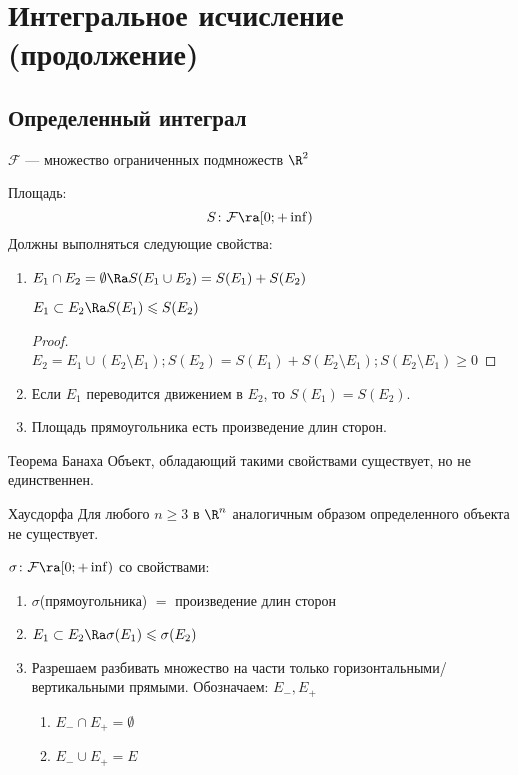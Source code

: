 \chapter{Интегральное исчисление (продолжение)}
\section{Определенный интеграл}

\begin{Def}
	$\mathcal{F}$ --- множество ограниченных подмножеств $\R^2$
\end{Def}

\begin{Def}
	Площадь:
	\[ S\colon \mathcal{F} \ra [0; +\inf) \]
	Должны выполняться следующие свойства:

	\begin{enumerate}
	\item 
		$E_1 \cap E_2 = \emptyset \Ra S(E_1 \cup E_2) = S(E_1) + S(E_2)$
		\begin{conseq*}
			$E_1 \subset E_2 \Ra S(E_1) \leqslant S(E_2)$
		\end{conseq*}
		\begin{proof}
			$E_2 = E_1 \cup (E_2 \setminus E_1); S(E_2) = S(E_1) + S(E_2 \setminus E_1); S(E_2 \setminus E_1) \geqslant 0$
		\end{proof}
	
	\item 
		Если $E_1$ переводится движением в $E_2$, то $S(E_1) = S(E_2)$.

	\item 
		Площадь прямоугольника есть произведение длин сторон.
	\end{enumerate} 
\end{Def}

\begin{theorem}{Теорема Банаха}
	Объект, обладающий такими свойствами существует, но не единственнен.
\end{theorem}

\begin{theorem}{Хаусдорфа}
	Для любого $n \ge 3$ в $\R^n$ аналогичным образом определенного объекта не существует.
\end{theorem}

\begin{Def}
	$\sigma\colon \mathcal{F} \ra [0; +\inf)$ со свойствами:
	\begin{enumerate}
	\item 
		$\sigma$(прямоугольника) $=$ произведение длин сторон

	\item 
		$E_1 \subset E_2 \Ra \sigma(E_1) \leqslant \sigma(E_2)$
	
	\item 
		Разрешаем разбивать множество на части только горизонтальными/вертикальными прямыми. Обозначаем: $E_{-}, E_{+}$
		\begin{enumerate}
			\item $E_{-} \cap E_{+} = \emptyset$
			\item $E_{-} \cup E_{+} = E$
		\end{enumerate}
	\end{enumerate} 
\end{Def}

